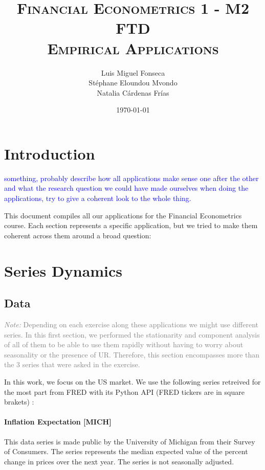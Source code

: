 \documentclass[hidelinks,12pts]{article}
\DeclareMathOperator{\1}{\mathbbm{1}}
\begin{document}
        \title{\scshape{Financial Econometrics 1 - M2 FTD \\ Empirical Applications}}
        \author{Luis Miguel Fonseca \\ Stéphane Eloundou Mvondo\\ Natalia Cárdenas Frías }
        \date{\today}
        \maketitle 

\tableofcontents
\newpage


\section*{Introduction} 
\textcolor{blue}{something, probably describe how all applications make sense one after the other and what the research question we could have made ourselves when doing the applications, try to give a coherent look to the whole thing.}

This document compiles all our applications for the Financial Econometrics course. 
Each section represents a specific application, but we tried to make them coherent across them around a broad question: 





\section{Series Dynamics}\label{sec:dynamics}

\subsection{Data}
\textcolor{gray}{\emph{Note:} Depending on each exercise along these applications we might use different series. In this first section, we performed the stationarity and component analysis of all of them to be able to use them rapidly without having to worry about seasonality or the presence of UR. Therefore, this section encompasses more than the 3 series that were asked in the exercise.}

In this work, we focus on the US market.
We use the following series retreived for the most part from FRED with its Python API (FRED tickers are in square brakets) : 

\paragraph{Inflation Expectation [MICH]}
This data series is made public by the University of Michigan from their Survey of Consumers. 
The series represents the median expected value of the percent change in prices over the next year. 
The series is not seasonally adjusted.
\end{document}
